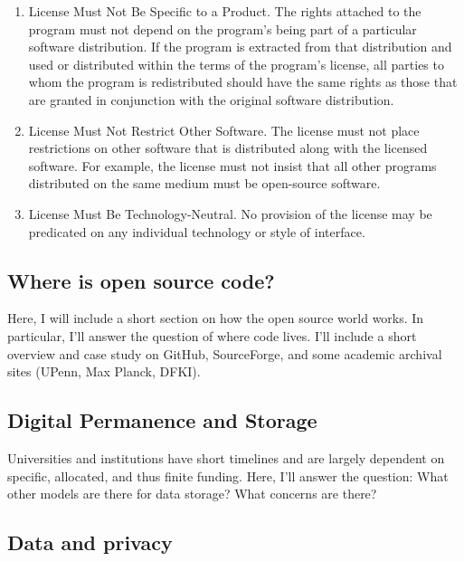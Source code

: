 \begin{enumerate}
\item{License Must Not Be Specific to a Product}.
  The rights attached to the program must not depend on the program's being part of a particular software distribution. If the program is extracted from that distribution and used or distributed within the terms of the program's license, all parties to whom the program is redistributed should have the same rights as those that are granted in conjunction with the original software distribution.

\item{License Must Not Restrict Other Software}.
  The license must not place restrictions on other software that is distributed along with the licensed software. For example, the license must not insist that all other programs distributed on the same medium must be open-source software.

\item{License Must Be Technology-Neutral}.
  No provision of the license may be predicated on any individual technology or style of interface.
\end{enumerate}


\subsection{Where is open source code?}

Here, I will include a short section on how the open source world works. In particular, I'll answer the question of where code lives. I'll include a short overview and case study on GitHub, SourceForge, and some academic archival sites (UPenn, Max Planck, DFKI).

\subsection{Digital Permanence and Storage}
\label{subsec:digital-permanence}

Universities and institutions have short timelines and are largely dependent on specific, allocated, and thus finite funding. Here, I'll answer the question: What other models are there for data storage? What concerns are there?


\subsection{Data and privacy}

